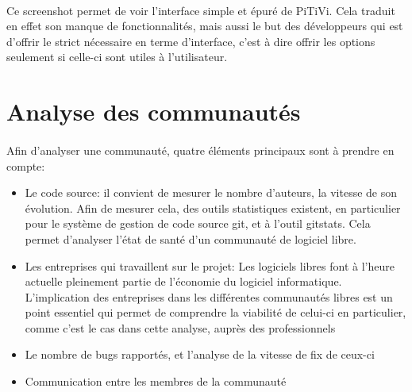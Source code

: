\paragraph{}

Ce screenshot permet de voir l'interface simple et épuré de PiTiVi. Cela
traduit en effet son manque de fonctionnalités, mais aussi le but des
développeurs qui est d'offrir le strict nécessaire en terme d'interface,
c'est à dire offrir les options seulement si celle-ci sont utiles à
l'utilisateur.

\newpage \section{Analyse des communautés}

\paragraph{}

Afin d'analyser une communauté, quatre éléments principaux sont à
prendre en compte:

\begin{itemize}

  \item {Le code source: il convient de mesurer le nombre d'auteurs, la
  vitesse de son évolution. Afin de mesurer cela, des outils statistiques
    existent, en particulier pour le système de gestion de code
    source git, et à l'outil gitstats. Cela permet
    d'analyser l'état de santé d'un communauté de logiciel libre.}

  \item {Les entreprises qui travaillent sur le projet: Les logiciels
  libres
    font à l'heure actuelle pleinement partie de l'économie
    du logiciel informatique. L'implication des entreprises dans les
    différentes communautés libres est un point essentiel qui permet
    de comprendre la viabilité de celui-ci en particulier, comme c'est
    le cas dans cette analyse, auprès des professionnels}

  \item {Le nombre de bugs rapportés, et l'analyse de la vitesse de fix
    de ceux-ci}

  \item {Communication entre les membres de la communauté}

\end{itemize}

